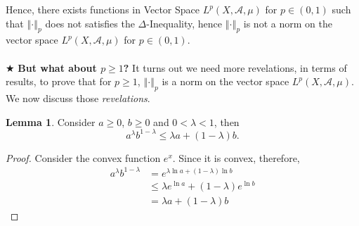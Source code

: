 \documentclass{article}
\theoremstyle{definition}
\theoremstyle{remark}
\theoremstyle{definition}
\theoremstyle{definition}
\theoremstyle{definition}
\newtheorem*{lemma*}{Lemma}
\newcommand{\norm}[1]{\left \Vert #1 \right \Vert}
\newcommand{\alg}[1]{\mathscr{#1}}
\newcommand{\Lp}[1]{L^{p}\left (#1\right )}
\begin{document}
Hence, there exists functions in Vector Space $ \Lp{X,\alg{A},\mu} $ for $ p\in (0,1) $ such that $ \norm{\cdot}_p $ does not satisfies the $ \Delta $-Inequality, hence $ \norm{\cdot}_p $ is not a norm on the vector space $ \Lp{X,\alg{A},\mu} $ for $ p\in (0,1) $.\\\\
$ \bigstar $ \textbf{But what about $ p \ge 1 $?} It turns out we need more revelations, in terms of results, to prove that for $ p\ge 1 $, $ \norm{\cdot}_p $ is a norm on the vector space $ \Lp{X,\alg{A},\mu} $. We now discuss those \emph{revelations}.
\newpage
\begin{lemma*}
	Consider $ a\ge 0  $, $ b\ge 0 $ and $ 0<\lambda < 1 $, then 
	\[a^{\lambda}b^{1-\lambda} \le \lambda a + (1-\lambda) b.\]
\end{lemma*}
\begin{proof}
	Consider the convex function $e^{x}  $. Since it is convex, therefore,
	\begin{equation*}
		\begin{split}
			a^{\lambda} b^{1-\lambda} &= e^{\lambda  \ln a + (1-\lambda) \ln b}\\ &\le \lambda e^{\ln a} + (1-\lambda) e^{\ln b}\\
			&= \lambda a + (1-\lambda ) b
		\end{split}
	\end{equation*}
\end{proof}
\hrulefill
\end{document}
